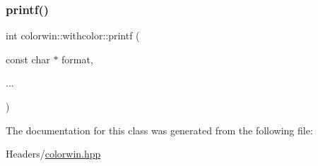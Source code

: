 \subsubsection{\texorpdfstring{printf()}{printf()}}
{\footnotesize\ttfamily int colorwin\+::withcolor\+::printf (\begin{DoxyParamCaption}\item[{const char $\ast$}]{format,  }\item[{}]{... }\end{DoxyParamCaption})\hspace{0.3cm}{\ttfamily [inline]}}



The documentation for this class was generated from the following file\+:\begin{DoxyCompactItemize}
\item 
Headers/\hyperlink{colorwin_8hpp}{colorwin.\+hpp}\end{DoxyCompactItemize}
